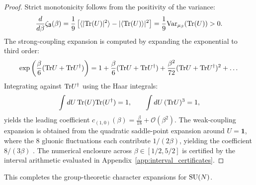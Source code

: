 \begin{proof}
Strict monotonicity follows from the positivity of the variance:
\begin{equation}
\frac{d}{d\beta} \zeta_{\mathbf{3}}(\beta) = \frac{1}{9} \left[ \langle |\mathrm{Tr}(U)|^2 \rangle - |\langle \mathrm{Tr}(U) \rangle|^2 \right] = \frac{1}{9} \mathrm{Var}_{\mu_\beta}(\mathrm{Tr}(U)) > 0.
\end{equation}
The strong-coupling expansion is computed by expanding the exponential to third order:
\begin{equation}
\exp\left( \frac{\beta}{6} (\mathrm{Tr} U + \mathrm{Tr} U^\dagger) \right) = 1 + \frac{\beta}{6}(\mathrm{Tr} U + \mathrm{Tr} U^\dagger) + \frac{\beta^2}{72}(\mathrm{Tr} U + \mathrm{Tr} U^\dagger)^2 + \dots
\end{equation}
Integrating against $\mathrm{Tr} U^\dagger$ using the Haar integrals:
\begin{equation}
\int dU \, \mathrm{Tr}(U) \mathrm{Tr}(U^\dagger) = 1, \qquad \int dU \, (\mathrm{Tr} U)^3 = 1,
\end{equation}
yields the leading coefficient $c_{(1,0)}(\beta) = \frac{\beta}{18} + \mathcal{O}(\beta^2)$.
The weak-coupling expansion is obtained from the quadratic saddle-point expansion around $U = \mathbf{1}$, where the 8 gluonic fluctuations each contribute $1/(2\beta)$, yielding the coefficient $8/(3\beta)$ \cite{Creutz1983}. The numerical enclosure across $\beta \in [1/2, 5/2]$ is certified by the interval arithmetic evaluated in Appendix~\ref{app:interval_certificates}.
\end{proof}

This completes the group-theoretic character expansions for $\mathrm{SU}(N)$.
